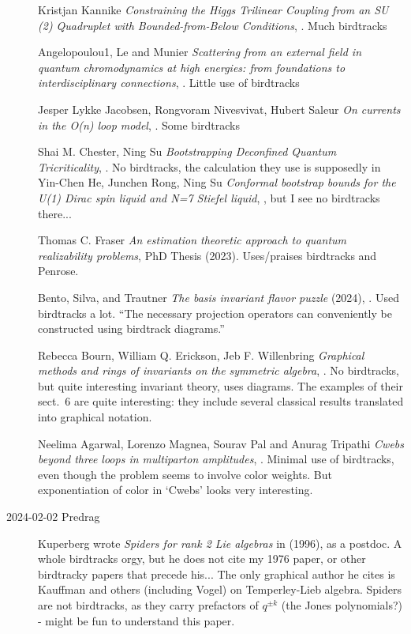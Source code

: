\begin{description}
Kristjan Kannike
{\em Constraining the Higgs Trilinear Coupling
from an SU (2) Quadruplet
with Bounded-from-Below Conditions},
.
Much birdtracks

Angelopoulou1, Le and Munier
{\em Scattering from an external field in quantum chromodynamics at
high energies: from foundations to interdisciplinary connections},
.
Little use of birdtracks


Jesper Lykke Jacobsen, Rongvoram Nivesvivat, Hubert Saleur
{\em On currents in the O(n) loop model},
.
Some birdtracks


Shai M. Chester, Ning Su
{\em Bootstrapping Deconfined Quantum Tricriticality},
.
No birdtracks, the calculation they use is supposedly in
Yin-Chen He, Junchen Rong, Ning Su
{\em Conformal bootstrap bounds for the U(1) Dirac spin liquid and N=7 Stiefel liquid},
,
but I see no birdtracks there...

Thomas C. Fraser
{\em An estimation theoretic approach to quantum realizability problems},
{PhD Thesis} (2023).
Uses/praises birdtracks and Penrose.


Bento, Silva, and Trautner
{\em The basis invariant flavor puzzle} (2024),
.
Used birdtracks a lot.
``The necessary projection operators can conveniently be constructed
using birdtrack diagrams.''

Rebecca Bourn, William Q. Erickson, Jeb F. Willenbring
{\em Graphical methods and rings of invariants on the symmetric algebra},
.
No birdtracks, but quite interesting invariant theory, uses diagrams.
The examples of their sect.~6 are quite interesting: they include several
classical results translated into graphical notation.

Neelima Agarwal, Lorenzo Magnea, Sourav Pal and Anurag Tripathi
{\em Cwebs beyond three loops in multiparton amplitudes},
.
Minimal use of birdtracks, even though the problem seems to involve color weights.
But exponentiation of color in `Cwebs' looks very interesting.



\item[2024-02-02 Predrag]
Kuperberg wrote {\em Spiders for rank 2 {Lie} algebras}
in (1996), as a postdoc. A whole birdtracks orgy, but he does not cite my
1976 paper, or other birdtracky papers that precede his... The
only graphical author he cites is Kauffman and others (including Vogel)
on Temperley-Lieb algebra. Spiders are not birdtracks, as they carry
prefactors of $q^{\pm k}$ (the Jones polynomials?) -
might be fun to understand this paper.


\end{description}
